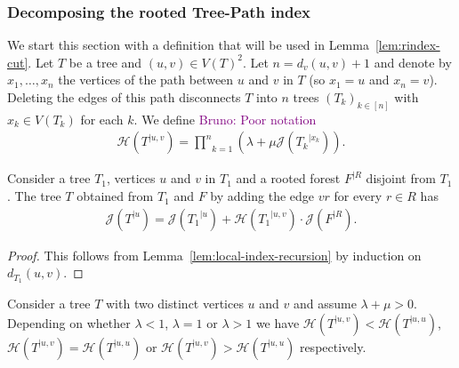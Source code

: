 \documentclass[11 pt]{modarticle}
\newcommand{\vsetof}[1]{V(#1)}
\newcommand{\distance}[3]{d_{#3}(#1,#2)}
\newcommand{\rtree}[2]{{#1}^{\lvert #2}}
\newcommand{\rindexsymbol}{\mathcal{J}}
\newcommand{\rindex}[2]{\rindexsymbol(\rtree{#2}{#1})}
\newcommand{\aindexsymbol}{\mathcal{H}}
\newcommand{\aindex}[3]{\aindexsymbol(\rtree{#3}{#1, #2})}
\newcommand{\bldcomment}[1]{\textcolor{purple}{{\footnotesize Bruno:} #1}}
\begin{document}
\subsubsection{Decomposing the rooted Tree-Path index}

We start this section with a definition that will be used in Lemma~\ref{lem:rindex-cut}. Let $T$ be a tree and $(u,v)\in\vsetof{T}^2$. Let $n=\distance{u}{v}{v} + 1$ and denote by $x_1, \dots, x_n$ the vertices of the path between $u$ and $v$ in $T$ (so $x_1 = u$ and $x_n = v$). Deleting the edges of this path disconnects $T$ into $n$ trees $(T_k)_{k\in[n]}$ with $x_k\in\vsetof{T_k}$ for each $k$. We define
\bldcomment{Poor notation}
\begin{eqnarray}
	\aindex{u}{v}{T} = \underset{k=1}{\overset{n}{\prod}} (\lambda + \mu \rindex{x_k}{T_k}). \label{eq:aindex}
\end{eqnarray}

\begin{lem}\label{lem:rindex-cut}
	Consider a tree $T_1$, vertices $u$ and $v$ in $T_1$ and a rooted forest $\rtree{F}{R}$ disjoint from $T_1$. The tree $T$ obtained from $T_1$ and $F$ by adding the edge $vr$ for every $r \in R$ has
\begin{eqnarray*}
	\rindex{u}{T} = \rindex{u}{T_1} + \aindex{u}{v}{T_1} \cdot \rindex{R}{F}.
\end{eqnarray*}
\end{lem}

\begin{proof}
This follows from Lemma~\ref{lem:local-index-recursion} by induction on $\distance{u}{v}{T_1}$.
\end{proof}


\begin{lem}\label{lem:aindex-comp}
Consider a tree $T$ with two distinct vertices $u$ and $v$ and assume $\lambda + \mu > 0$. Depending on whether $\lambda < 1$, $\lambda = 1$ or $\lambda > 1$ we have  $\aindex{u}{v}{T} < \aindex{u}{u}{T}$, $\aindex{u}{v}{T} = \aindex{u}{u}{T}$ or $\aindex{u}{v}{T} > \aindex{u}{u}{T}$ respectively.
\end{lem}
\end{document}
